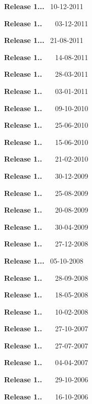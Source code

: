 \begin{DoxyItemize}
\item {\bfseries{Release 1...}}~ 10-\/12-\/2011 
\item {\bfseries{Release 1..}}~~~ 03-\/12-\/2011 
\item {\bfseries{Release 1...}}~ 21-\/08-\/2011 
\item {\bfseries{Release 1..}}~~~ 14-\/08-\/2011 
\item {\bfseries{Release 1..}}~~~ 28-\/03-\/2011 
\item {\bfseries{Release 1..}}~~~ 03-\/01-\/2011 
\item {\bfseries{Release 1..}}~~~ 09-\/10-\/2010 
\item {\bfseries{Release 1..}}~~~ 25-\/06-\/2010 
\item {\bfseries{Release 1..}}~~~ 15-\/06-\/2010 
\item {}
 
\item {\bfseries{Release 1..}}~~~ 21-\/02-\/2010 
\item {\bfseries{Release 1..}}~~~ 30-\/12-\/2009 
\item {\bfseries{Release 1..}}~~~ 25-\/08-\/2009 
\item {\bfseries{Release 1..}}~~~ 20-\/08-\/2009 
\item {}
 
\item {\bfseries{Release 1..}}~~~ 30-\/04-\/2009 
\item {\bfseries{Release 1..}}~~~ 27-\/12-\/2008 
\item {\bfseries{Release 1...}}~ 05-\/10-\/2008 
\item {\bfseries{Release 1..}}~~~ 28-\/09-\/2008 
\item {\bfseries{Release 1..}}~~~ 18-\/05-\/2008 
\item {\bfseries{Release 1..}}~~~ 10-\/02-\/2008 
\item {\bfseries{Release 1..}}~~~ 27-\/10-\/2007 
\item {\bfseries{Release 1..}}~~~ 27-\/07-\/2007 
\item {\bfseries{Release 1..}}~~~ 04-\/04-\/2007 
\item {\bfseries{Release 1..}}~~~ 29-\/10-\/2006 
\item {\bfseries{Release 1..}}~~~ 16-\/10-\/2006 
\item {}
 

\end{DoxyItemize}
